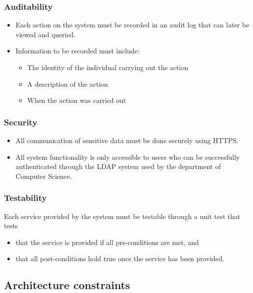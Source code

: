 \documentclass[11pt,a4paper]{article}
\begin{document}
		\subsubsection{Auditability}
		\begin{itemize}
			\item Each action on the system must be recorded in an audit log that can later be viewed and queried.
			\item Information to be recorded must include:
			\begin{itemize}
				\item The identity of the individual carrying out the action
				\item A description of the action
				\item When the action was carried out
			\end{itemize}
		\end{itemize}
		
		\subsubsection{Security}
		\begin{itemize}
			\item All communication of sensitive data must be done securely using HTTPS.
			\item All system functionality is only accessible to users who can be successfully authenticated through the LDAP system used by the department of Computer Science.
		\end{itemize}
		
		\subsubsection{Testability}
		Each service provided by the system must be testable through a unit test that tests
		\begin{itemize}
			\item that the service is provided if all pre-conditions are met, and
			\item that all post-conditions hold true once the service has been provided.
		\end{itemize}
		 
	\subsection{ Architecture constraints}
 
\end{document}
